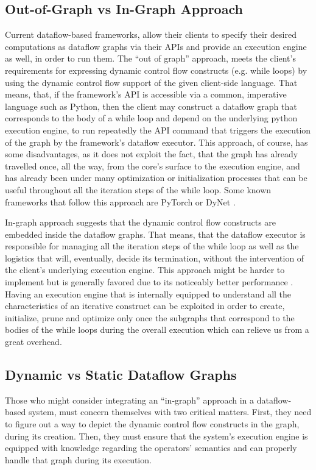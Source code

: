 \documentclass[ack,preface]{dithesis}
\begin{document}
    \subsection{Out-of-Graph vs In-Graph Approach}
Current dataflow-based frameworks, allow their clients to specify their desired computations as dataflow graphs via their APIs and provide an execution engine as well, in order to run them. The “out of graph” approach, meets the client’s requirements for expressing dynamic control flow constructs (e.g. while loops) by using the dynamic control flow support of the given client-side language. That means, that, if the framework’s API is accessible via a common, imperative language such as Python, then the client may construct a dataflow graph that corresponds to the body of a while loop and depend on the underlying python execution engine, to run repeatedly the API command that triggers the execution of the graph by the framework’s dataflow executor. This approach, of course, has some disadvantages, as it does not exploit the fact, that the graph has already travelled once, all the way, from the core’s surface to the execution engine, and has already been under many optimization or initialization processes that can be useful throughout all the iteration steps of the while loop.
Some known frameworks that follow this approach are  PyTorch \cite{Paszke2017} or DyNet  \cite{ Neubig2017DyNetTD}.

In-graph approach suggests that the dynamic control flow constructs are embedded inside the dataflow graphs. That means, that the dataflow executor is responsible for managing all the iteration steps of the while loop as well as the logistics that will, eventually, decide its termination, without the intervention of the client’s underlying execution engine.
This approach might be harder to implement but is generally favored due to its noticeably better performance \cite{Yu:2018}. Having an execution engine that is internally equipped to understand all the characteristics of an iterative construct can be exploited in order to create, initialize, prune and optimize only once the subgraphs that correspond to the bodies of  the while loops during the overall execution which can relieve us from a great overhead.

    \subsection{Dynamic vs Static Dataflow Graphs}
Those who might consider integrating an “in-graph” approach in a dataflow-based system, must concern themselves with two critical matters. First, they need to figure out a way to depict the dynamic control flow constructs in the graph, during its creation. Then, they must ensure that  the system’s execution engine is equipped with knowledge regarding the operators' semantics  and can properly handle that graph during its execution.
\end{document}
